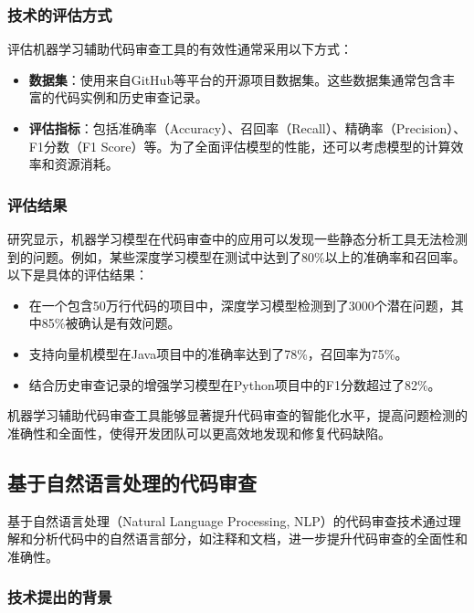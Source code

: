 \documentclass{article}
\begin{document}
\subsubsection{技术的评估方式}

评估机器学习辅助代码审查工具的有效性通常采用以下方式：

\begin{itemize}
    \item \textbf{数据集}：使用来自GitHub等平台的开源项目数据集。这些数据集通常包含丰富的代码实例和历史审查记录。
    \item \textbf{评估指标}：包括准确率（Accuracy）、召回率（Recall）、精确率（Precision）、F1分数（F1 Score）等。为了全面评估模型的性能，还可以考虑模型的计算效率和资源消耗。
\end{itemize}

\subsubsection{评估结果}

研究显示，机器学习模型在代码审查中的应用可以发现一些静态分析工具无法检测到的问题。例如，某些深度学习模型在测试中达到了80\%以上的准确率和召回率。以下是具体的评估结果：

\begin{itemize}
    \item 在一个包含50万行代码的项目中，深度学习模型检测到了3000个潜在问题，其中85\%被确认是有效问题。
    \item 支持向量机模型在Java项目中的准确率达到了78\%，召回率为75\%。
    \item 结合历史审查记录的增强学习模型在Python项目中的F1分数超过了82\%。
\end{itemize}

机器学习辅助代码审查工具能够显著提升代码审查的智能化水平，提高问题检测的准确性和全面性，使得开发团队可以更高效地发现和修复代码缺陷。

\subsection{基于自然语言处理的代码审查}

基于自然语言处理（Natural Language Processing, NLP）的代码审查技术通过理解和分析代码中的自然语言部分，如注释和文档，进一步提升代码审查的全面性和准确性。

\subsubsection{技术提出的背景}
\end{document}
